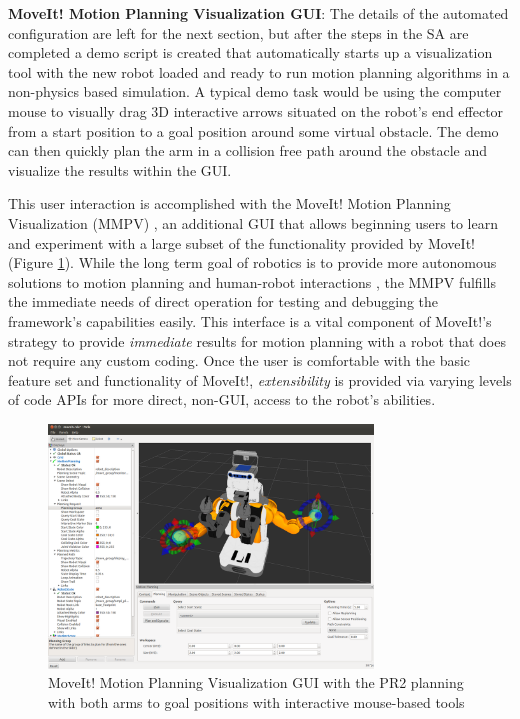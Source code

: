 \documentclass[10pt,journal,compsoc]{joser1}
\begin{document}
{{\bf MoveIt! Motion Planning Visualization GUI}: The details of the automated
configuration are left for the next section, but after the steps in the SA are
completed a demo script is created that automatically starts up a visualization
tool with the new robot loaded and ready to run motion planning algorithms in a
non-physics based simulation. A typical demo task would be using the computer
mouse to visually drag 3D interactive arrows situated on the robot's end
effector from a start position to a goal position around some virtual obstacle.
The demo can then quickly plan the arm in a collision free path around the
obstacle and visualize the results within the GUI. 

This user interaction is accomplished with the MoveIt! Motion Planning
Visualization (MMPV) \cite{moveit}, an additional GUI that allows beginning
users to learn and experiment with a large subset of the functionality provided
by MoveIt! (Figure \ref{fig:motionrvizplugin}). While the long term goal of
robotics is to provide more autonomous solutions to motion planning and
human-robot interactions \cite{yancotaxonomy}, the MMPV fulfills the immediate
needs of direct operation for testing and debugging the framework's capabilities
easily. This interface is a vital component of MoveIt!'s strategy to provide
\textit{immediate} results for motion planning with a robot that does not
require any custom coding. Once the user is comfortable with the basic feature
set and functionality of MoveIt!, \textit{extensibility} is provided via varying
levels of code APIs for more direct, non-GUI, access to the robot's abilities.

\begin{figure}[!t]
\centering
\includegraphics[width=3.4in]{coleman_20131110_f08}
\caption{MoveIt! Motion Planning Visualization GUI with the PR2 planning with
both arms to goal positions with interactive mouse-based tools}
\label{fig:motionrvizplugin}
\end{figure}

}
\end{document}
